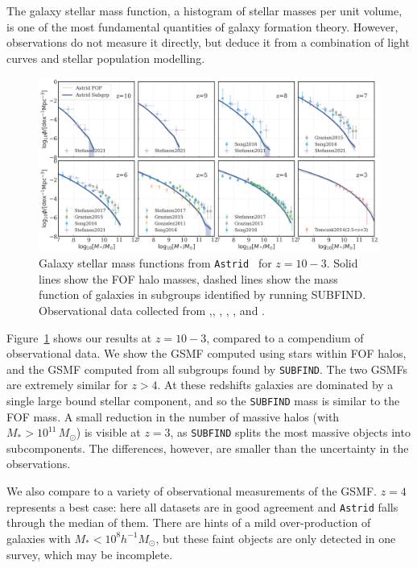 \documentclass[fleqn,usenatbib]{mnras}
\def\astrid{\texttt{Astrid} }
\def\msun{\, M_{\odot}}
\begin{document}
The galaxy stellar mass function, a histogram of stellar masses per unit volume, is one of the most fundamental quantities of galaxy formation theory. However, observations do not measure it directly, but deduce it from a combination of light curves and stellar population modelling. 

\begin{figure}
\centering
  \includegraphics[width=1.0\textwidth]{plots/GSMF-subfind-z10-z3.png}
  \caption{Galaxy stellar mass functions from \astrid~for $z=10-3$. Solid lines show the FOF halo masses, dashed lines show the mass function of galaxies in subgroups identified by running SUBFIND. Observational data collected from \citet{Gonzalez2011},\citet{Tomczak2014}, \citet{Grazian2015}, \citet{Song2016}, \citet{Stefanon2017}, and \citet{Stefanon2021}.}
  \label{fig:GSMF}
\end{figure}

Figure~\ref{fig:GSMF} shows our results at $z = 10 - 3$, compared to a compendium of observational data. We show the GSMF computed using stars within FOF halos, and the GSMF computed from all subgroups found by \texttt{SUBFIND}. The two GSMFs are extremely similar for $z > 4$. At these redshifts galaxies are dominated by a single large bound stellar component, and so the \texttt{SUBFIND} mass is similar to the FOF mass. A small reduction in the number of massive halos (with $M_* > 10^{11} \msun$) is visible at $z=3$, as \texttt{SUBFIND} splits the most massive objects into subcomponents. The differences, however, are smaller than the uncertainty in the observations.

We also compare to a variety of observational measurements of the GSMF. $z=4$ represents a best case: here all datasets are in good agreement and \astrid falls through the median of them. There are hints of a mild over-production of galaxies with $M_* < 10^8 h^{-1} M_\odot$, but these faint objects are only detected in one survey, which may be incomplete.
\end{document}
